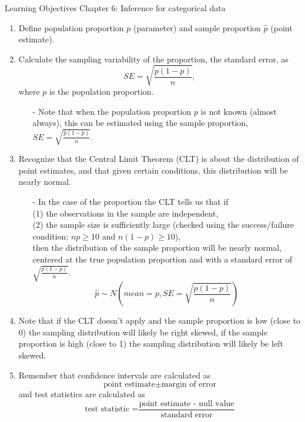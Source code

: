 \documentclass[11pt]{article}
\begin{document}
{\LARGE \textcolor{oiB}{Learning Objectives \hfill Chapter 6: Inference for categorical data}} \\

%
\begin{enumerate}
\renewcommand\labelenumi{\textcolor{light}{\textbf{LO \theenumi.}}}

\item Define population proportion $p$ (parameter) and sample proportion $\hat{p}$ (point estimate).

\item Calculate the sampling variability of the proportion, the standard error, as 
\[ SE = \sqrt{\frac{p(1-p)}{n}}, \] 
where $p$ is the population proportion.
\begin{itemize}
\item[-] Note that when the population proportion $p$ is not known (almost always), this can be estimated using the sample proportion, $SE = \sqrt{\frac{\hat{p}(1-\hat{p})}{n}}$.
\end{itemize}

\item Recognize that the Central Limit Theorem (CLT) is about the distribution of point estimates, and that given certain conditions, this distribution will be nearly normal.
\begin{itemize}
\item[-] In the case of the proportion the CLT tells us that if \\
(1) the observations in the sample are independent, \\
(2) the sample size is sufficiently large (checked using the success/failure condition: $np \ge 10$ and $n(1-p) \ge 10$), \\
then the distribution of the sample proportion will be nearly normal, centered at the true population proportion and with a standard error of $\sqrt{\frac{p(1-p)}{n}}$.
\[ \hat{p} \sim N \left( mean = p, SE = \sqrt{\frac{p(1-p)}{n}} \right) \]
\end{itemize}

\item Note that if the CLT doesn't apply and the sample proportion is low (close to 0) the sampling distribution will likely be right skewed, if the sample proportion is high (close to 1) the sampling distribution will likely be left skewed. 

\item Remember that confidence intervals are calculated as 
\[ \text{point estimate} \pm \text{margin of error} \]
and test statistics are calculated as 
\[ \text{test statistic =} \frac{\text{point estimate - null value}}{\text{standard error}} \]


\end{enumerate}
\end{document}
